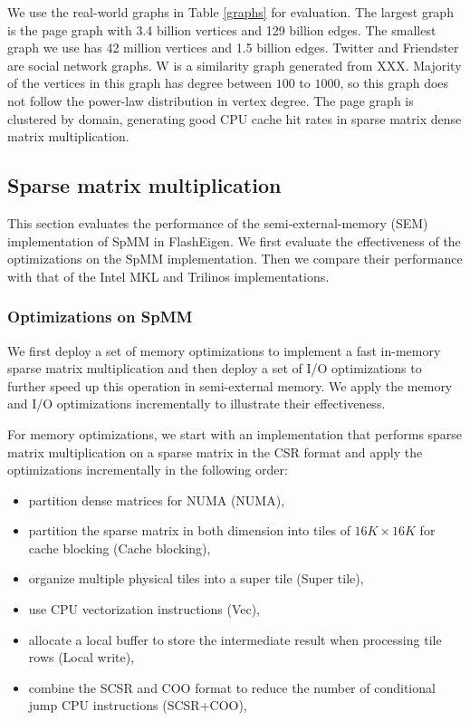 We use the real-world graphs in Table \ref{graphs} for evaluation. The largest
graph is the page graph with 3.4 billion vertices and 129 billion edges.
The smallest graph we use has 42 million vertices and 1.5 billion edges.
Twitter and Friendster are social network graphs. W is a similarity graph
generated from XXX. Majority of the vertices in this graph has degree between
$100$ to $1000$, so this graph does not follow the power-law distribution
in vertex degree.
The page graph is clustered by domain, generating good CPU cache hit rates
in sparse matrix dense matrix multiplication.

\subsection{Sparse matrix multiplication}
This section evaluates the performance of the semi-external-memory (SEM)
implementation of SpMM in FlashEigen. We first
evaluate the effectiveness of the optimizations on the SpMM implementation.
Then we compare their performance with that of the Intel MKL and Trilinos
implementations.

\subsubsection{Optimizations on SpMM}
We first deploy a set of memory optimizations to implement a fast
in-memory sparse matrix multiplication and then deploy a set of I/O
optimizations to further speed up this operation in semi-external memory.
We apply the memory and I/O optimizations incrementally to illustrate their
effectiveness.

For memory optimizations, we start with an implementation that performs sparse
matrix multiplication on a sparse matrix in the CSR format and apply
the optimizations incrementally in the following order:
\begin{itemize} \itemsep1pt \parskip0pt 
	\item partition dense matrices for NUMA (NUMA),
	\item partition the sparse matrix in both dimension into tiles of
		$16K \times 16K$ for cache blocking (Cache blocking),
	\item organize multiple physical tiles into a super tile (Super tile),
	\item use CPU vectorization instructions (Vec),
	\item allocate a local buffer to store the intermediate result when
		processing tile rows (Local write),
	\item combine the SCSR and COO format to reduce the number of conditional
		jump CPU instructions (SCSR+COO),
\end{itemize}

